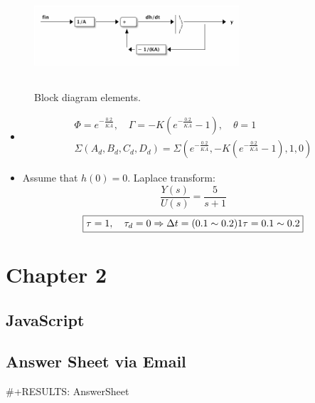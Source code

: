 \documentclass[11pt]{article}
\begin{document}
\begin{figure}[!htpb]
\centering
\includegraphics[width=3in,height=1.5in]{hello.png}
{\caption{Block diagram elements.}}
\end{figure}

\begin{itemize}
\item \[\begin{array}{c}
        \Phi = e^{-\frac{0.2}{K\overline{A}}}, \quad \Gamma = -K\left(e^{-\frac{0.2}{K\overline{A}}} - 1\right), \quad \theta = 1 \\[0.5cm]
        \Sigma(A_{d},B_{d},C_{d},D_{d}) = \Sigma\left( e^{-\frac{0.2}{K\overline{A}}}, -K\left(e^{-\frac{0.2}{K\overline{A}}} - 1\right), 1, 0\right)
        \end{array}\]
\item Assume that \(h(0) = 0\). Laplace transform:
\[ \frac{Y(s)}{U(s)} = \frac{5}{s+1}\]
\[\boxed{ \nonumber  \tau = 1, \quad \tau_{d} = 0\Rightarrow \Delta t = (0.1\sim0.2)1\tau = 0.1\sim 0.2}\]
\end{itemize}

\section{Chapter 2}
\label{sec-2}
\subsection{JavaScript}
\label{sec-2-1}
\subsection{Answer Sheet via Email}
\label{sec-2-2}
#+RESULTS: AnswerSheet


\begin{Form}[action=mailto:forms@stackexchange.invalid?subject={CHE576HW02}&body=token,method=post]
    \noindent{}\\[1mm]
    \noindent{}\\[1mm]
    \noindent{}\\[1mm]
    \noindent{}\\[1mm]
     \quad {} \quad 
\end{Form}
\end{document}
